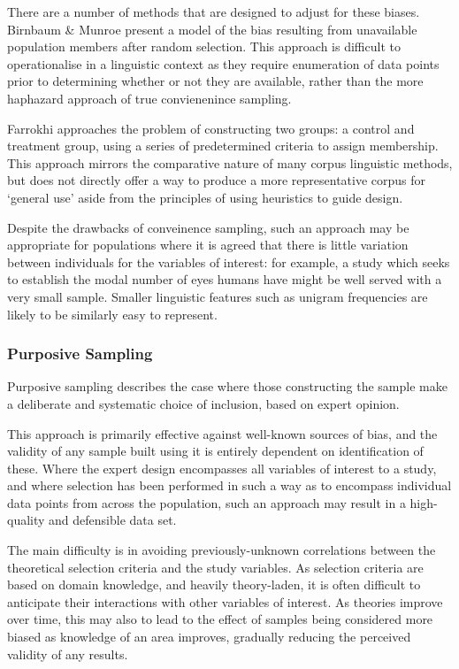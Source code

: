 There are a number of methods that are designed to adjust for these biases.  Birnbaum \& Munroe\cite{birnbaum1950munroe} present a model of the bias resulting from unavailable population members after random selection.  This approach is difficult to operationalise in a linguistic context as they require enumeration of data points prior to determining whether or not they are available, rather than the more haphazard approach of true convienenince sampling.

Farrokhi\cite{farrokhi2012rethinking} approaches the problem of constructing two groups: a control and treatment group, using a series of predetermined criteria to assign membership.  This approach mirrors the comparative nature of many corpus linguistic methods, but does not directly offer a way to produce a more representative corpus for `general use' aside from the principles of using heuristics to guide design.

Despite the drawbacks of conveinence sampling, such an approach may be appropriate for populations where it is agreed that there is little variation between individuals for the variables of interest: for example, a study which seeks to establish the modal number of eyes humans have might be well served with a very small sample.  Smaller linguistic features such as unigram frequencies are likely to be similarly easy to represent.



\subsubsection{Purposive Sampling}
Purposive sampling describes the case where those constructing the sample make a deliberate and systematic choice of inclusion, based on expert opinion.

This approach is primarily effective against well-known sources of bias, and the validity of any sample built using it is entirely dependent on identification of these.  Where the expert design encompasses all variables of interest to a study, and where selection has been performed in such a way as to encompass individual data points from across the population, such an approach may result in a high-quality and defensible data set.

The main difficulty is in avoiding previously-unknown correlations between the theoretical selection criteria and the study variables.  As selection criteria are based on domain knowledge, and heavily theory-laden, it is often difficult to anticipate their interactions with other variables of interest.  As theories improve over time, this may also to lead to the effect of samples being considered more biased as knowledge of an area improves, gradually reducing the perceived validity of any results.

